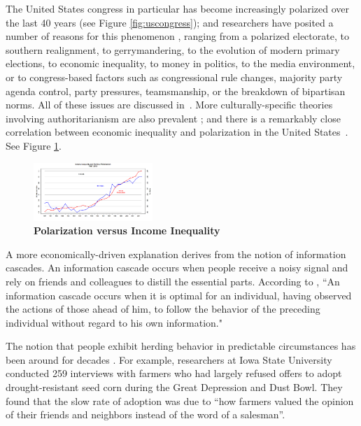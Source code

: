 The United States congress in particular has become increasingly polarized over the last 40 years (see Figure \ref{fig:uscongress}); and
researchers have posited a number of reasons for this phenomenon \cite{barber2015causes}\cite{poole1984polarization}, ranging from a polarized electorate, to southern realignment, to gerrymandering, to the evolution of modern primary elections, to economic inequality, to money in politics, to the media environment, or to congress-based factors such as congressional rule changes, majority party agenda control, party pressures, teamsmanship, or the breakdown of bipartisan norms.  All of these issues are discussed in~\cite{poole1984polarization}.
More culturally-specific theories involving authoritarianism are also prevalent \cite{hetherington2009authoritarianism}; and there is a remarkably close correlation between economic
inequality and polarization in the United States~\cite{mccarty2006polarized}.  See Figure \ref{fig:inequality}.

\begin{figure}[htbp]
\begin{center}
\includegraphics[width=0.4\textwidth]{figs/8141eb7a0}
\caption{{\bf Polarization versus Income Inequality}}
\label{fig:inequality}
\end{center}
\end{figure}


A more economically-driven explanation derives from the notion of information cascades. An information cascade occurs when people receive a noisy signal and rely on friends and colleagues to distill the essential parts.  According to \cite{bikhchandani1992theory},
``An information cascade occurs when it is optimal for an individual, having observed the actions of those ahead of him, to follow the behavior of the preceding individual without regard to his own information." 

The notion that people exhibit herding behavior in predictable circumstances has been around for decades \cite{shiller1995conversation}.  For example, researchers at Iowa State University conducted 259 interviews with farmers who had largely refused offers to adopt drought-resistant seed corn during the Great Depression and Dust Bowl.  They found that the slow rate of adoption was due to ``how farmers valued the opinion of their friends and neighbors instead of the word of a salesman''\cite{beal1957diffusion}.



